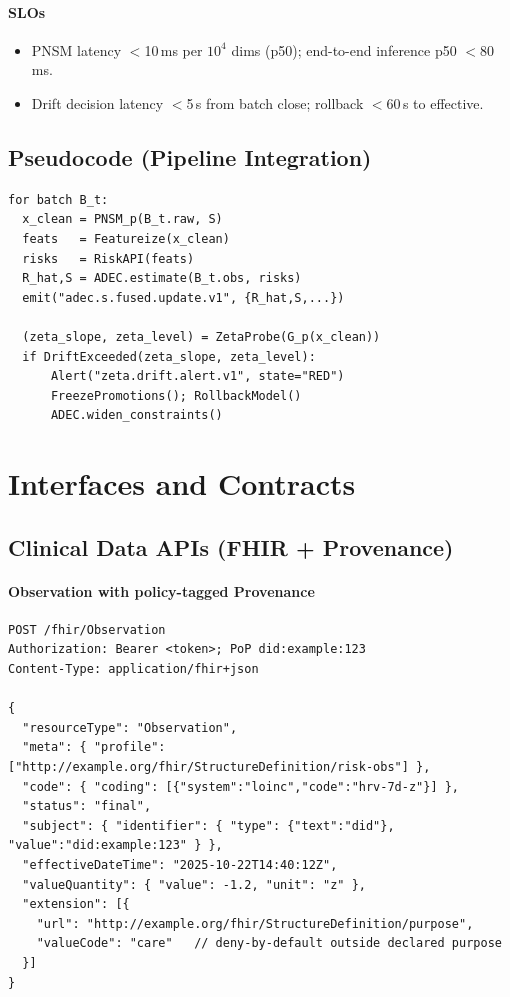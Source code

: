 \documentclass[11pt]{article}
\theoremstyle{plain}
\begin{document}
\paragraph{SLOs}
\begin{itemize}
  \item PNSM latency $<$10\,ms per $10^4$ dims (p50); end-to-end inference p50 $<$80\,ms.
  \item Drift decision latency $<$5\,s from batch close; rollback $<$60\,s to effective.
\end{itemize}

\subsection{Pseudocode (Pipeline Integration)}
\begin{verbatim}
for batch B_t:
  x_clean = PNSM_p(B_t.raw, S)
  feats   = Featureize(x_clean)
  risks   = RiskAPI(feats)
  R_hat,S = ADEC.estimate(B_t.obs, risks)
  emit("adec.s.fused.update.v1", {R_hat,S,...})

  (zeta_slope, zeta_level) = ZetaProbe(G_p(x_clean))
  if DriftExceeded(zeta_slope, zeta_level):
      Alert("zeta.drift.alert.v1", state="RED")
      FreezePromotions(); RollbackModel()
      ADEC.widen_constraints()
\end{verbatim}


\section{Interfaces and Contracts}

\subsection{Clinical Data APIs (FHIR + Provenance)}
\paragraph{Observation with policy-tagged Provenance}
\begin{verbatim}
POST /fhir/Observation
Authorization: Bearer <token>; PoP did:example:123
Content-Type: application/fhir+json

{
  "resourceType": "Observation",
  "meta": { "profile": ["http://example.org/fhir/StructureDefinition/risk-obs"] },
  "code": { "coding": [{"system":"loinc","code":"hrv-7d-z"}] },
  "status": "final",
  "subject": { "identifier": { "type": {"text":"did"}, "value":"did:example:123" } },
  "effectiveDateTime": "2025-10-22T14:40:12Z",
  "valueQuantity": { "value": -1.2, "unit": "z" },
  "extension": [{
    "url": "http://example.org/fhir/StructureDefinition/purpose",
    "valueCode": "care"   // deny-by-default outside declared purpose
  }]
}
\end{verbatim}
\end{document}
